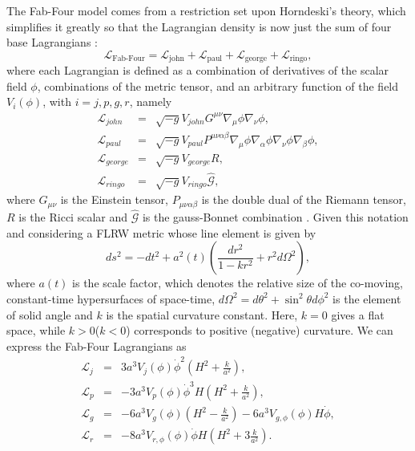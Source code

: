 \documentclass[onecolumn,superscriptaddress,secnumarabic,amssymb,amsmath,nobibnotes,aps,prd,nofootinbib,altaffilletter]{revtex4}
\newcommand{\lag}{\mathcal{L}}
\begin{document}
The Fab-Four model comes from a restriction set upon Horndeski's theory, which simplifies it greatly so that the Lagrangian density is now just the sum of four base Lagrangians \cite{Charmousis_2012}:
\begin{equation}
\lag_{\text{Fab-Four}}   = \lag_{\text{john}} + \lag_{\text{paul}} + \lag_{\text{george}} + \lag_{\text{ringo}},
\end{equation}
where each Lagrangian is defined as a combination of derivatives of the scalar field $\phi$, combinations of the metric tensor, and an arbitrary function of the field $V_i(\phi)$, with $i=j,p,g,r$, namely 
\begin{eqnarray}
\lag_{john}&=&\sqrt{-g}V_{john}G^{\mu\nu}\nabla_\mu \phi \nabla_\nu \phi,\\
\lag_{paul}&=&\sqrt{-g}V_{paul}P^{\mu\nu\alpha\beta}\nabla_\mu \phi \nabla_\alpha \phi \nabla_\nu \phi\nabla_\beta \phi,\\
\lag_{george}&=&\sqrt{-g}V_{george}R,\\
\lag_{ringo}&=&\sqrt{-g}V_{ringo}\hat{\mathcal{G}},
\end{eqnarray}
where $G_{\mu\nu}$ is the Einstein tensor, $P_{\mu\nu\alpha\beta}$ is the double dual of the Riemann tensor, $R$ is the Ricci scalar and $\hat{\mathcal{G}}$ is the gauss-Bonnet combination \cite{Copeland:2012qf}. 
Given this notation and considering a FLRW metric whose line element is given by
\begin{equation}
    ds^2= -dt^2 + a^2(t)\left(\frac{dr^2}{1-kr^2}+r^2d\Omega^2
\right),
    \label{eq:FLRW}
\end{equation}
where $a(t)$ is the scale factor, which denotes the relative size of the co-moving, constant-time hypersurfaces of space-time, $d\Omega^2 = d\theta^2 +\sin^2 \theta d\phi^2$ is the element of solid angle and $k$ is the spatial curvature constant. Here, $k=0$ gives a flat space, while $k>0$($k<0$) corresponds to positive (negative) curvature. We can express the Fab-Four Lagrangians as \cite{Copeland:2012qf}
\begin{eqnarray}
\lag_{j}&=&3a^3V_{j}(\phi) \dot\phi^2 \left(H^2+ \frac{k}{a^2}\right)
\label{eq:lagjconmetrica},\\
\lag_{p}&=&-3a^3V_{p}(\phi) \dot\phi^3H \left(H^2+ \frac{k}{a^2}\right)
\label{eq:lagpconmetrica},\\
\lag_{g}&=&-6a^3V_{g}(\phi) \left(H^2- \frac{k}{a^2}\right)-6a^3V_{{g},\phi}(\phi) H\dot\phi
\label{eq:laggconmetrica},\\
\lag_{r}&=&-8a^3V_{{r},\phi}(\phi)\dot\phi H \left(H^2+3 \frac{k}{a^2}\right).
\label{eq:lagrconmetrica}
\end{eqnarray}
\end{document}
